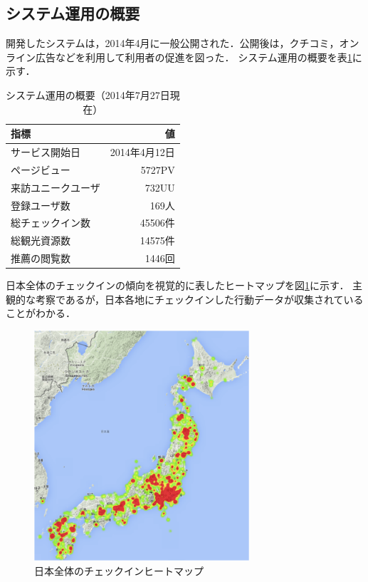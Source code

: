 \documentclass{jsarticle}
\begin{document}
\newpage
\subsection{システム運用の概要}

開発したシステムは，2014年4月に一般公開された．公開後は，クチコミ，オンライン広告などを利用して利用者の促進を図った．
システム運用の概要を表\ref{operation_description}に示す．


\begin{table}[!h]
\small
\caption{システム運用の概要（2014年7月27日現在）}
\begin{center}
\begin{tabular}{l|r}
\label{operation_description}
指標 & 値 \\ \hline
サービス開始日 & 2014年4月12日 \\
ページビュー & 5727PV \\
来訪ユニークユーザ & 732UU \\
登録ユーザ数 & 169人 \\
総チェックイン数 & 45506件 \\
総観光資源数 & 14575件 \\
推薦の閲覧数 & 1446回 \\
\end{tabular}
\end{center}
\end{table}
    
日本全体のチェックインの傾向を視覚的に表したヒートマップを図\ref{heatmap1}に示す．
主観的な考察であるが，日本各地にチェックインした行動データが収集されていることがわかる．

\begin{figure}[!ht]
\begin{center}
\includegraphics[width=8.0cm]{./image/heatmap1.png}
\caption{日本全体のチェックインヒートマップ}
\label{heatmap1}
\end{center}
\end{figure}
\end{document}
